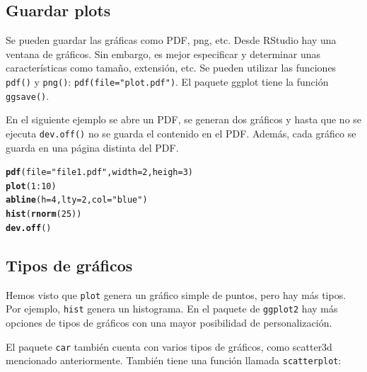 \documentclass{config/apuntes}\usepackage[]{graphicx}\usepackage[]{xcolor}
\makeatletter
\newcommand{\hlnum}[1]{\textcolor[rgb]{0.686,0.059,0.569}{#1}}%
\newcommand{\hlsng}[1]{\textcolor[rgb]{0.192,0.494,0.8}{#1}}%
\newcommand{\hlopt}[1]{\textcolor[rgb]{0,0,0}{#1}}%
\newcommand{\hldef}[1]{\textcolor[rgb]{0.345,0.345,0.345}{#1}}%
\newcommand{\hlkwc}[1]{\textcolor[rgb]{0.333,0.667,0.333}{#1}}%
\newcommand{\hlkwd}[1]{\textcolor[rgb]{0.737,0.353,0.396}{\textbf{#1}}}%
\newenvironment{kframe}{%
 \def\at@end@of@kframe{}%
 \ifinner\ifhmode%
  \def\at@end@of@kframe{\end{minipage}}%
  \begin{minipage}{\columnwidth}%
 \fi\fi%
 \def\FrameCommand##1{\hskip\@totalleftmargin \hskip-\fboxsep
 \colorbox{shadecolor}{##1}\hskip-\fboxsep
     \hskip-\linewidth \hskip-\@totalleftmargin \hskip\columnwidth}%
 \MakeFramed {\advance\hsize-\width
   \@totalleftmargin\z@ \linewidth\hsize
   \@setminipage}}%
 {\par\unskip\endMakeFramed%
 \at@end@of@kframe}
\newenvironment{knitrout}{}{} %
\newcommand{\code}[1]{\texttt{#1}}
\makeatother
\begin{document}
\subsection{Guardar plots}
Se pueden guardar las gráficas como PDF, png, etc. Desde RStudio hay una ventana de gráficos. Sin embargo, es mejor especificar y determinar unas características como tamaño, extensión, etc. Se pueden utilizar las funciones \code{pdf()} y \code{png()}: \code{pdf(file="plot.pdf")}. El paquete ggplot tiene la función \code{ggsave()}.

En el siguiente ejemplo se abre un PDF, se generan dos gráficos y hasta que no se ejecuta \code{dev.off()} no se guarda el contenido en el PDF. Además, cada gráfico se guarda en una página distinta del PDF. 
\begin{knitrout}
\color{fgcolor}\begin{kframe}
\begin{alltt}
\hlkwd{pdf}\hldef{(}\hlkwc{file} \hldef{=} \hlsng{"file1.pdf"}\hldef{,} \hlkwc{width} \hldef{=} \hlnum{2}\hldef{,} \hlkwc{heigh} \hldef{=} \hlnum{3}\hldef{)}
\hlkwd{plot}\hldef{(}\hlnum{1}\hlopt{:}\hlnum{10}\hldef{)}
\hlkwd{abline}\hldef{(}\hlkwc{h} \hldef{=} \hlnum{4}\hldef{,} \hlkwc{lty} \hldef{=} \hlnum{2}\hldef{,} \hlkwc{col} \hldef{=} \hlsng{"blue"}\hldef{)}
\hlkwd{hist}\hldef{(}\hlkwd{rnorm}\hldef{(}\hlnum{25}\hldef{))}
\hlkwd{dev.off}\hldef{()}
\end{alltt}
\end{kframe}
\end{knitrout}

\subsection{Tipos de gráficos}
Hemos visto que \code{plot} genera un gráfico simple de puntos, pero hay más tipos. Por ejemplo, \code{hist} genera un histograma. En el paquete de \code{ggplot2} hay más opciones de tipos de gráficos con una mayor posibilidad de personalización.

El paquete \code{car} también cuenta con varios tipos de gráficos, como scatter3d mencionado anteriormente. También tiene una función llamada \code{scatterplot}:
\end{document}
